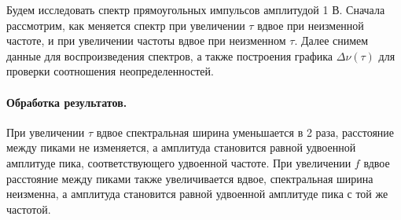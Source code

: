 \documentclass[12pt,a4paper]{article}
\begin{document}
Будем исследовать спектр прямоугольных импульсов амплитудой 1 В. Сначала рассмотрим, как меняется спектр при увеличении $\tau$ вдвое при неизменной частоте, и при увеличении частоты вдвое при неизменном $\tau$. Далее снимем данные для воспроизведения спектров, а также построения графика $\Delta\nu(\tau)$ для проверки соотношения неопределенностей.
\paragraph{Обработка результатов.} При увеличении $\tau$ вдвое спектральная ширина уменьшается в 2 раза, расстояние между пиками не изменяется, а амплитуда становится равной удвоенной амплитуде пика, соответствующего удвоенной частоте. При увеличении $f$ вдвое расстояние между пиками также увеличивается вдвое, спектральная ширина неизменна, а амплитуда становится равной удвоенной амплитуде пика с той же частотой.
\end{document}
